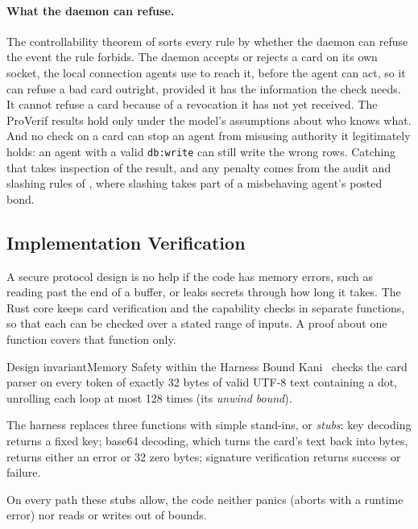 \documentclass[11pt,a4paper]{article}
\theoremstyle{definition}
\begin{document}
\paragraph{What the daemon can refuse.} The controllability theorem of  sorts every rule by whether the daemon can refuse the event the rule forbids. The daemon accepts or rejects a card on its own socket, the local connection agents use to reach it, before the agent can act, so it can refuse a bad card outright, provided it has the information the check needs. It cannot refuse a card because of a revocation it has not yet received. The ProVerif results hold only under the model's assumptions about who knows what. And no check on a card can stop an agent from misusing authority it legitimately holds: an agent with a valid \texttt{db:write} can still write the wrong rows. Catching that takes inspection of the result, and any penalty comes from the audit and slashing rules of , where slashing takes part of a misbehaving agent's posted bond.

\subsection{Implementation Verification}

A secure protocol design is no help if the code has memory errors, such as reading past the end of a buffer, or leaks secrets through how long it takes. The Rust core keeps card verification and the capability checks in separate functions, so that each can be checked over a stated range of inputs. A proof about one function covers that function only.

\begin{pdclaim}{Design invariant}{Memory Safety within the Harness Bound}
\setlength{\parskip}{4pt plus 1pt}
\label{inv:anchor-memory-safety}
Kani~ checks the card parser on every token of exactly 32 bytes of valid UTF-8 text containing a dot, unrolling each loop at most 128 times (its \emph{unwind bound}).

The harness replaces three functions with simple stand-ins, or \emph{stubs}: key decoding returns a fixed key; base64 decoding, which turns the card's text back into bytes, returns either an error or 32 zero bytes; signature verification returns success or failure.

On every path these stubs allow, the code neither panics (aborts with a runtime error) nor reads or writes out of bounds.
\end{pdclaim}
\end{document}
